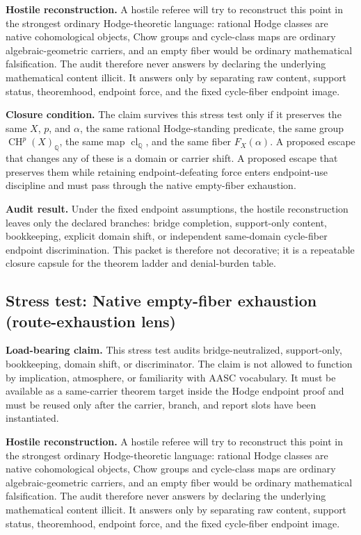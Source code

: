 \documentclass[11pt]{article}
\newcommand{\QQ}{\mathbb{Q}}
\newcommand{\CH}{\operatorname{CH}}
\newcommand{\clQ}{\operatorname{cl}_{\QQ}}
\begin{document}
\par\noindent\textbf{Hostile reconstruction.} A hostile referee will try to reconstruct this point in the strongest ordinary Hodge-theoretic language: rational Hodge classes are native cohomological objects, Chow groups and cycle-class maps are ordinary algebraic-geometric carriers, and an empty fiber would be ordinary mathematical falsification. The audit therefore never answers by declaring the underlying mathematical content illicit. It answers only by separating raw content, support status, theoremhood, endpoint force, and the fixed cycle-fiber endpoint image.

\par\noindent\textbf{Closure condition.} The claim survives this stress test only if it preserves the same $X$, $p$, and $\alpha$, the same rational Hodge-standing predicate, the same group $\CH^p(X)_\QQ$, the same map $\clQ$, and the same fiber $F_X(\alpha)$. A proposed escape that changes any of these is a domain or carrier shift. A proposed escape that preserves them while retaining endpoint-defeating force enters endpoint-use discipline and must pass through the native empty-fiber exhaustion.

\par\noindent\textbf{Audit result.} Under the fixed endpoint assumptions, the hostile reconstruction leaves only the declared branches: bridge completion, support-only content, bookkeeping, explicit domain shift, or independent same-domain cycle-fiber endpoint discrimination. This packet is therefore not decorative; it is a repeatable closure capsule for the theorem ladder and denial-burden table.


\subsection{Stress test: Native empty-fiber exhaustion (route-exhaustion lens)}

\par\noindent\textbf{Load-bearing claim.} This stress test audits bridge-neutralized, support-only, bookkeeping, domain shift, or discriminator. The claim is not allowed to function by implication, atmosphere, or familiarity with AASC vocabulary. It must be available as a same-carrier theorem target inside the Hodge endpoint proof and must be reused only after the carrier, branch, and report slots have been instantiated.

\par\noindent\textbf{Hostile reconstruction.} A hostile referee will try to reconstruct this point in the strongest ordinary Hodge-theoretic language: rational Hodge classes are native cohomological objects, Chow groups and cycle-class maps are ordinary algebraic-geometric carriers, and an empty fiber would be ordinary mathematical falsification. The audit therefore never answers by declaring the underlying mathematical content illicit. It answers only by separating raw content, support status, theoremhood, endpoint force, and the fixed cycle-fiber endpoint image.
\end{document}
